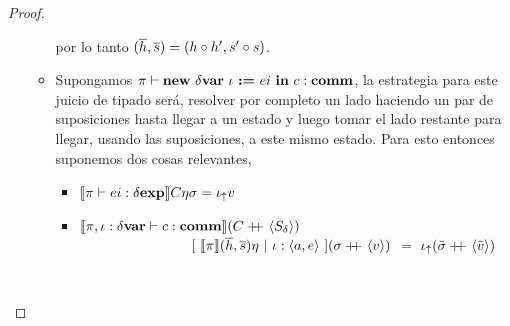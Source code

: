 \begin{proof}
\begin{itemize}
\begin{itemize}
por lo tanto $(\overline{h},\overline{s}) = (h \circ h',s'\circ s)$.\\

\item Supongamos $\pi \vdash \textbf{new} \ \delta \textbf{var} \ \iota \ \textbf{:=} \ ei \ \textbf{in} \ c : \textbf{comm}$, la estrategia para
este juicio de tipado ser\'a, resolver por completo un lado haciendo un par de suposiciones
hasta llegar a un estado y luego tomar el lado restante para llegar, usando las suposiciones,
a este mismo estado. Para esto entonces suponemos dos cosas relevantes,

\begin{itemize}
\item $\llbracket \pi \vdash ei : \delta \textbf{exp} \rrbracket C\eta\sigma = \iota_{\uparrow} v$
\item $\llbracket \pi,\iota:\delta \textbf{var} \vdash c : \textbf{comm} \rrbracket(C +\kern-1.3ex+\kern0.8ex \langle S_\delta \rangle)$\\
\indent \ \ \ \ \ \ \ \ \ \ \ \ \ \ \ \
$[ \ \semBrcks{\pi}(\hover,\sover)\eta \ | \ \iota:\lrangles{a,e} \ ]
(\sigma\concat \lrangles{v})$ $=$ $\iota_{\uparrow} (\tilde{\sigma} +\kern-1.3ex+\kern0.8ex \langle \tilde{v} \rangle)$
\end{itemize}

\


\end{itemize}
\end{itemize}
\end{proof}
